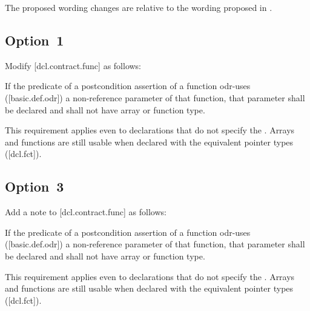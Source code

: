 The proposed wording changes are relative to the wording proposed in \cite{P2900R10}.

\subsection*{Option~1}

Modify [dcl.contract.func] as follows:

\begin{adjustwidth}{0.5cm}{0.5cm}
If the predicate of a postcondition assertion of a function odr-uses ([basic.def.odr]) a
non-reference parameter of that function, that parameter shall be declared  and shall not have array or function type.
\begin{note}
This requirement applies even to declarations
that do not specify the . Arrays and functions are still usable when declared with the equivalent pointer types ([dcl.fct]).
\end{note}
\begin{example}
\tcode{[...]}
\end{example}
\end{adjustwidth}


\subsection*{Option~3}

Add a note to [dcl.contract.func] as follows:

\begin{adjustwidth}{0.5cm}{0.5cm}
If the predicate of a postcondition assertion of a function odr-uses ([basic.def.odr]) a
non-reference parameter of that function, that parameter shall be declared  and
shall not have array or function type.
\begin{note}
This requirement applies even to declarations
that do not specify the . Arrays and functions are still usable when declared with the equivalent pointer types ([dcl.fct]).
\end{note}
\begin{example}
\tcode{[...]}
\end{example}

\end{adjustwidth}



